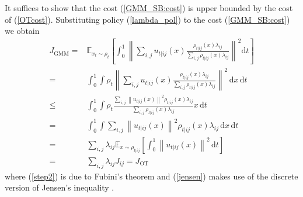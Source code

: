 \documentclass[twoside]{article}
\renewcommand{\eqref}[1]{(\ref{#1})}
\renewcommand{\E}{\mathbb{E}}
\renewcommand{\d}{\mathrm{d}}
\newcommand{\george}[1]{{\color{blue}[George: #1]}}
\begin{document}
It suffices to show that the cost \eqref{GMM_SB:cost} is upper bounded by the cost of 
\eqref{OTcost}.
Substituting policy \eqref{lambda_pol} to the cost \eqref{GMM_SB:cost} we obtain
\begin{subequations}
\begin{align}
     J_{\mathrm{GMM}} =  & \E_{x_t \sim \rho_t} \left[ \int_{0}^{1}{ \left\| \sum_{i,j} {u_{t|ij}(x) \frac{ \rho_{t|ij}(x)\lambda_{ij}}{\sum_{i,j} \rho_{t|ij}(x) \lambda_{ij}}} \right\|^2 \d t} \right] \\
    = & \int_{0}^{1} \int { \rho_t \left\| \sum_{i,j} {u_{t|ij}(x) \frac{ \rho_{t|ij}(x)\lambda_{ij}}{\sum_{i,j} \rho_{t|ij}(x) \lambda_{ij}}} \right\|^2 \, \d x \, \d t} \label{step2} \\
    \leq & \int_{0}^{1} \int { \rho_t \frac{ \sum_{i,j} \left\|u_{t|ij}(x)\right\|^2 \rho_{t|ij}(x)\lambda_{ij}}{\sum_{i,j} \rho_{t|ij}(x) \lambda_{ij}}  x \, \d t}  \label{jensen} \\
    = & \int_{0}^{1}  \int { \sum_{i,j} \left\|u_{t|ij}(x)\right\|^2 \rho_{t|ij}(x) \lambda_{ij}}  \, \d x \, \d t \\
    = & \sum_{i,j} \lambda_{ij} \E_{x \sim \rho_{t|ij}} \left[
 \int_{0}^{1} { \left\|u_{t|ij}(x)\right\|^2}  \, \d t \right] \\
    = & \sum_{i,j} \lambda_{ij} J_{ij} = J_{\mathrm{OT}}
\end{align}
\end{subequations}
where \eqref{step2} is due to Fubini's theorem 
\cite[Theorem~6.1]{wheeden1977measure} and \eqref{jensen} makes use of the discrete version of Jensen's inequality \cite[Theorem~7.35]{wheeden1977measure}.

\end{document}
